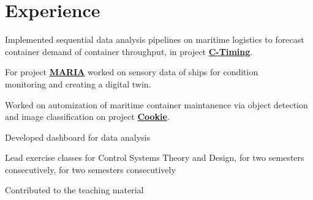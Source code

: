 \documentclass[]{resume}
\begin{document}
\begin{minipage}[t]{0.66\textwidth}
	\begin{minipage}[t]{0.90\textwidth}


		\section{Experience}

		\vspace{10pt} %
		\begin{tightemize}
			\item Implemented sequential data analysis pipelines on maritime logistics to forecast container demand of container throughput, in project \textbf{\href{https://www.cml.fraunhofer.de/en/research-projects/C_TIMING.html}{C-Timing}}.
			\item For project \textbf{\href{https://www.cml.fraunhofer.de/en/research-projects/MARIA.html}{MARIA}} worked on sensory data of ships for condition \\monitoring and creating a digital twin.
			\item Worked on automization of maritime container maintanence via object detection and image classification on project \textbf{\href{https://www.cml.fraunhofer.de/en/research-projects/COOKIE.html}{Cookie}}.
			\item Developed dashboard for data analysis
		\end{tightemize}
		\sectionsep

		\begin{tightemize}
			\item Lead exercise classes for Control Systems Theory and Design, for two semesters consecutively, for two semesters consecutively
			\item Contributed to the teaching material
		\end{tightemize}
		\sectionsep


\end{minipage}
\end{minipage}
\end{document}
